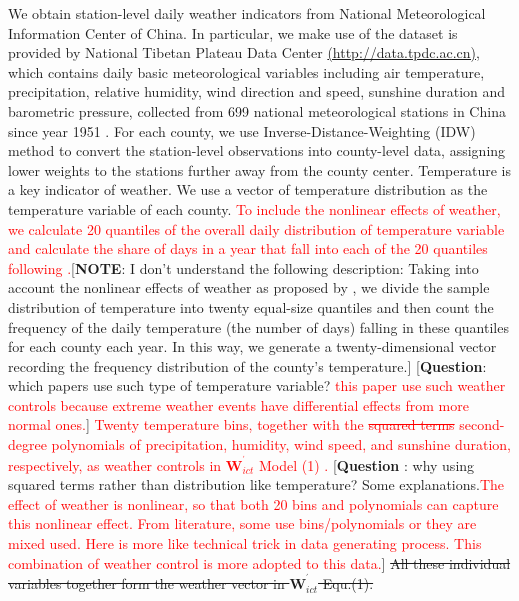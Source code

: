 \documentclass[12pt]{article}
\begin{document}
We obtain station-level daily weather indicators from National
Meteorological Information Center of China. In particular, we make use of
the dataset is provided by National Tibetan Plateau Data Center %
\url{(http://data.tpdc.ac.cn)}, which contains daily basic meteorological
variables including air temperature, precipitation, relative humidity, wind
direction and speed, sunshine duration and barometric pressure, collected
from 699 national meteorological stations in China since year 1951 %
\citep{Dailymeteorologicaldataset}. For each county, we use
Inverse-Distance-Weighting (IDW) method to convert the station-level
observations into county-level data, assigning lower weights to the stations
further away from the county center. Temperature is a key indicator of
weather. We use a vector of temperature distribution as the temperature
variable of each county. \textcolor{red}{To
include the nonlinear effects of weather, we calculate 20 quantiles of the overall daily distribution of temperature variable and calculate the share of days in a year that fall into each of the 20 quantiles following \citep{deschenes2017defensive}.}[\textbf{NOTE}: I don't understand the following
description: Taking into account the nonlinear effects of weather as
proposed by \citep{deschenes2017defensive}, we divide the sample
distribution of temperature into twenty equal-size quantiles and then count
the frequency of the daily temperature (the number of days) falling in these
quantiles for each county each year. In this way, we generate a
twenty-dimensional vector recording the frequency distribution of the
county's temperature.] [\textbf{Question}: which papers use such type of
temperature variable?\textcolor{red}{\citep{deschenes2017defensive} this paper use such weather controls because extreme weather events have differential effects from more normal ones.}] \textcolor{red}{Twenty temperature bins, together with the \sout{squared terms} \textcolor{red}{second-degree polynomials} of precipitation, humidity, wind speed,
and sunshine duration, respectively, as weather controls in $\mathbf{W}_{ict}^{^{\prime }}$ Model (1) \citep{chen2022effect}.} [\textbf{Question}%
: why using squared terms rather than distribution like temperature? Some
explanations.\textcolor{red}{The effect of weather is nonlinear, so that both 20 bins and polynomials can capture this nonlinear effect. From literature, some use bins/polynomials or they are mixed used. Here is more like technical trick in data generating process. This combination of weather control is more adopted to this data.}] \sout{All these individual variables together form the weather
vector in $\mathbf{W}_{ict}^{^{\prime }}$ Equ.(1).}
\end{document}
